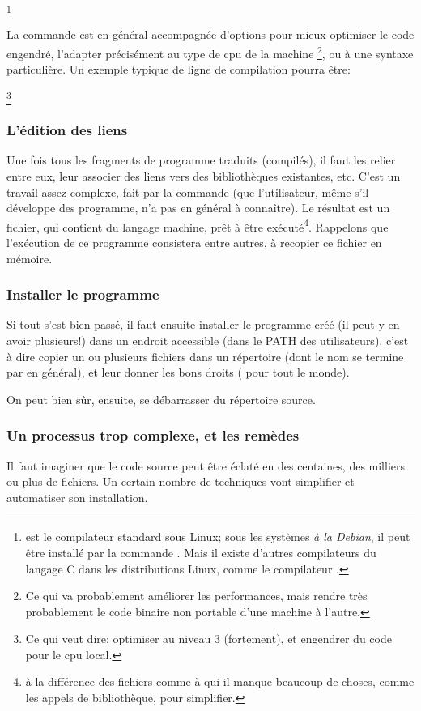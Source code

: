 \footnote{ est le compilateur
  standard sous Linux; sous les systèmes \emph{à la Debian}, il peut être
  installé par la commande . Mais il
  existe d'autres compilateurs du langage C dans les distributions
  Linux, comme le compilateur .}

La commande  est en général accompagnée d'options pour mieux
optimiser le code engendré, l'adapter précisément au type de cpu de
la machine \footnote{Ce qui va probablement améliorer les
  performances, mais rendre très probablement le code binaire non
  portable d'une machine à l'autre.}, ou à une syntaxe particulière.
Un exemple typique de ligne de compilation pourra être:

\footnote{Ce qui veut
  dire: optimiser au niveau 3 (fortement), et engendrer du code pour
  le cpu local.}
\subsubsection{L'édition des liens}
Une fois tous les fragments de programme traduits (compilés), il faut
les relier entre eux, leur associer des liens vers des bibliothèques
existantes, etc. C'est un travail assez complexe, fait par la commande
 (que l'utilisateur, même s'il développe des programme, n'a pas
en général à connaître). Le résultat est un fichier, qui contient du
langage machine, prêt à être exécuté\footnote{à la différence des
  fichiers comme  à qui il manque beaucoup de choses,
  comme les appels de bibliothèque, pour simplifier.}. Rappelons que l'exécution de ce programme consistera
entre autres, à  recopier ce fichier en mémoire.
\subsubsection{Installer le programme}
  Si tout s'est bien passé, il faut ensuite installer le programme
  créé (il peut y en avoir plusieurs!) dans un endroit accessible
  (dans le PATH des utilisateurs), c'est à dire copier un ou plusieurs
  fichiers dans un répertoire (dont le nom se termine par  en
  général), et leur donner les bons droits ( pour tout le
  monde).

  On peut bien sûr, ensuite, se débarrasser du répertoire source.
  \subsubsection{Un processus trop complexe, et les remèdes}
Il faut imaginer que le code source peut être éclaté en des centaines,
des milliers ou plus de fichiers. Un certain nombre de techniques vont
simplifier et automatiser son installation.

